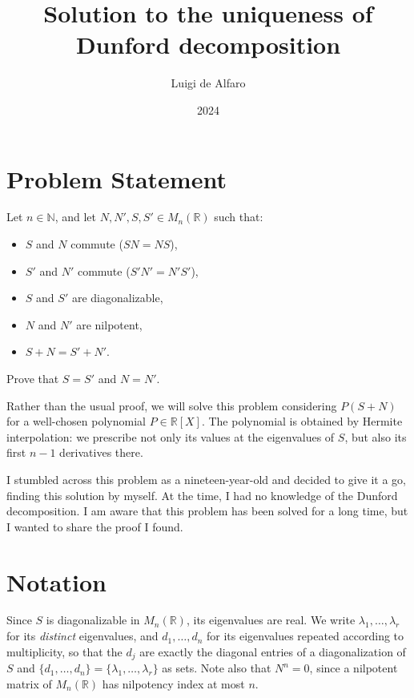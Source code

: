 \documentclass{article}
\title{Solution to the uniqueness of Dunford decomposition}
\author{Luigi de Alfaro}
\date{2024}
\begin{document}
\maketitle

\section{Problem Statement}

Let \( n \in \mathbb{N} \), and let \( N, N', S, S' \in M_n(\mathbb{R}) \) such that:
\begin{itemize}
    \item \( S \) and \( N \) commute (\( SN = NS \)),
    \item \( S' \) and \( N' \) commute (\( S'N' = N'S' \)),
    \item \( S \) and \( S' \) are diagonalizable,
    \item \( N \) and \( N' \) are nilpotent,
    \item \( S + N = S' + N' \).
\end{itemize}

Prove that \( S = S' \) and \( N = N' \).

Rather than the usual proof, we will solve this problem considering \( P(S + N) \) for a well-chosen polynomial \( P \in \mathbb{R}[X] \). The polynomial is obtained by Hermite interpolation: we prescribe not only its values at the eigenvalues of \( S \), but also its first \( n-1 \) derivatives there.

I stumbled across this problem as a nineteen-year-old and decided to give it a go, finding this solution by myself. At the time, I had no knowledge of the Dunford decomposition. I am aware that this problem has been solved for a long time, but I wanted to share the proof I found.

\section{Notation}


Since \( S \) is diagonalizable in \( M_n(\mathbb{R}) \), its eigenvalues are real. We write
\( \lambda_1, \dots, \lambda_r \) for its \emph{distinct} eigenvalues, and
\( d_1, \dots, d_n \) for its eigenvalues repeated according to multiplicity, so that the
\( d_j \) are exactly the diagonal entries of a diagonalization of \( S \) and
\( \{d_1, \dots, d_n\} = \{\lambda_1, \dots, \lambda_r\} \) as sets. Note also that
\( N^n = 0 \), since a nilpotent matrix of \( M_n(\mathbb{R}) \) has nilpotency index at
most \( n \).
\end{document}
